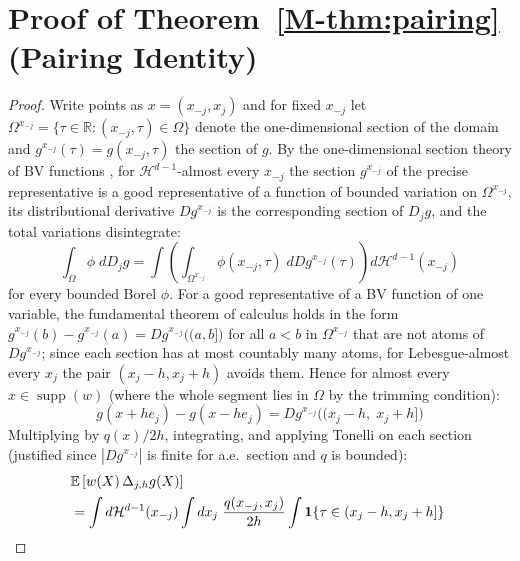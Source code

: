 \documentclass[12pt,a4paper]{article}
\numberwithin{equation}{section}
\theoremstyle{plain}
\theoremstyle{definition}
\newcommand{\R}{\mathbb{R}}
\newcommand{\E}{\mathbb{E}}
\newcommand{\abs}[1]{\left| #1 \right|}
\newcommand{\Dh}{\Delta_{j,h}}
\begin{document}
	\section{Proof of Theorem~\ref{M-thm:pairing} (Pairing Identity)}
	\label{app:thm_pairing}
	
	\begin{proof}
		Write points as $x = (x_{-j}, x_j)$ and for fixed $x_{-j}$ let
		$\Omega^{x_{-j}} = \{ \tau \in \R : (x_{-j}, \tau) \in \Omega \}$ denote the
		one-dimensional section of the domain and
		$g^{x_{-j}}(\tau) = g(x_{-j}, \tau)$ the section of $g$. By the
		one-dimensional section theory of BV functions
		\citep[Section~3.11]{ambrosio2000bv}, for $\mathcal{H}^{d-1}$-almost every
		$x_{-j}$ the section $g^{x_{-j}}$ of the precise representative is a good
		representative of a function of bounded variation on $\Omega^{x_{-j}}$, its
		distributional derivative $D g^{x_{-j}}$ is the corresponding section of
		$D_j g$, and the total variations disintegrate:
		\begin{equation}
			\int_\Omega \phi\; d D_j g
			= \int \left( \int_{\Omega^{x_{-j}}} \phi(x_{-j}, \tau)\;
			d D g^{x_{-j}}(\tau) \right) d\mathcal{H}^{d-1}(x_{-j})
			\label{eq:disintegration}
		\end{equation}
		for every bounded Borel $\phi$. For a good representative of a BV function of
		one variable, the fundamental theorem of calculus holds in the form
		$g^{x_{-j}}(b) - g^{x_{-j}}(a) = D g^{x_{-j}}\bigl((a, b]\bigr)$ for all
		$a < b$ in $\Omega^{x_{-j}}$ that are not atoms of $D g^{x_{-j}}$; since
		each section has at most countably many atoms, for
		Lebesgue-almost every $x_j$ the pair $(x_j - h, x_j + h)$ avoids them. Hence
		for almost every $x \in \operatorname{supp}(w)$ (where the whole segment lies
		in $\Omega$ by the trimming condition):
		\begin{equation}
			g(x + h e_j) - g(x - h e_j)
			= D g^{x_{-j}}\bigl((x_j - h,\; x_j + h]\bigr)
		\end{equation}
		Multiplying by $q(x)/2h$, integrating, and applying
		Tonelli on each section (justified since
		$\abs{D g^{x_{-j}}}$ is finite for a.e.\ section and $q$ is bounded):
		\begin{align}
			& \E\left[w(X)\, \Dh g(X)\right] \notag \\
			&= \int d\mathcal{H}^{d-1}(x_{-j}) \int dx_j\;
			\frac{q(x_{-j}, x_j)}{2h}
			\int \mathbf{1}\{\tau \in (x_j - h, x_j + h]\}\;

\end{align}
\end{proof}
\end{document}
